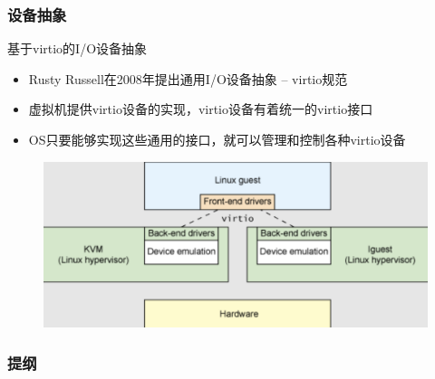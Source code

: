 \begin{frame}[fragile]
    \frametitle{设备抽象}
    基于virtio的I/O设备抽象
    \begin{itemize}
        \item Rusty Russell在2008年提出通用I/O设备抽象 – virtio规范
        \item 虚拟机提供virtio设备的实现，virtio设备有着统一的virtio接口
        \item OS只要能够实现这些通用的接口，就可以管理和控制各种virtio设备
    \end{itemize}
    \begin{figure}
        \includegraphics[width=0.6\linewidth]{figs/virtio.png}
    \end{figure}
\end{frame}
\begin{frame}
\frametitle{提纲} %
\tableofcontents %


\end{frame}
